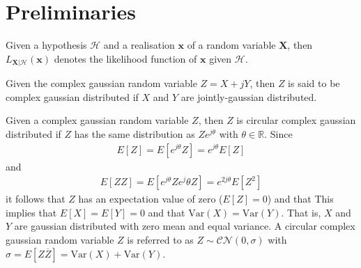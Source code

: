 \documentclass[a4paper, openany, oneside]{memoir}
\begin{document}
\section{Preliminaries}

\begin{blockDefinition}
Given a hypothesis $\mathcal{H}$ and a realisation $\mathbf{x}$ of a random variable $\mathbf{X}$, then $L_{\mathbf{X} | \mathcal{H}}(\mathbf{x})$ denotes the likelihood function of $\mathbf{x}$ given $\mathcal{H}$.
\end{blockDefinition}

\begin{blockDefinition}
Given the complex gaussian random variable $Z = X + jY$, then $Z$ is said to be complex gaussian distributed if $X$ and $Y$ are jointly-gaussian distributed.
\end{blockDefinition}

\begin{blockDefinition}
Given a complex gaussian random variable $Z$, then $Z$ is circular complex gaussian distributed if $Z$ has the same distribution as $Ze^{j\theta}$ with $\theta \in \mathbb{R}$. Since
\begin{align*}
	E\left[Z\right] = E\left[e^{j\theta}Z\right]  = e^{j\theta}E\left[Z\right] 
\end{align*}
and
\begin{align*}
	E\left[ZZ\right] = E\left[e^{j\theta}Z e^j\theta{Z}\right]  = e^{2j\theta}E\left[Z^2\right] 
\end{align*}
it follows that $Z$  has an expectation value of zero ($E\left[Z\right] = 0$) and that %
This implies that $E\left[X\right] = E\left[Y\right] = 0$ and that $\text{Var}\left(X\right) = \text{Var}\left(Y\right)$. That is, $X$ and $Y$ are gaussian distributed
with zero mean and equal variance. 
A circular complex gaussian random variable $Z$ is referred to as $Z \sim \mathcal{CN}(0,\sigma)$ with $\sigma= E\left[Z\overline{Z}\right] = \text{Var}\left(X\right) + \text{Var}\left(Y\right)$. 
\end{blockDefinition}
\end{document}
